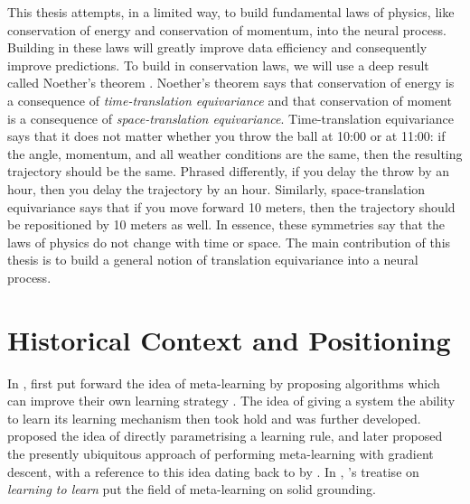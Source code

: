 \documentclass[12pt, twoside]{report}
\newcommand{\xrprefix}[1]{xr-#1}
\begin{document}
This thesis attempts, in a limited way, to build fundamental laws of physics, like conservation of energy and conservation of momentum, into the neural process.
Building in these laws will greatly improve data efficiency and consequently improve predictions.
To build in conservation laws, we will use a deep result called Noether's theorem \parencite{Noether:1918:Invariante_Variationsprobleme}.
Noether's theorem says that conservation of energy is a consequence of \emph{time-translation equivariance} and that conservation of moment is a consequence of \emph{space-translation equivariance}.
Time-translation equivariance says that it does not matter whether you throw the ball at 10:00 or at 11:00: if the angle, momentum, and all weather conditions are the same, then the resulting trajectory should be the same.
Phrased differently, if you delay the throw by an hour, then you delay the trajectory by an hour.
Similarly, space-translation equivariance says that if you move forward 10 meters, then the trajectory should be repositioned by 10 meters as well.
In essence, these symmetries say that the laws of physics do not change with time or space.
The main contribution of this thesis is to build a general notion of translation equivariance into a neural process.


\section{Historical Context and Positioning}
\label{sec:introduction:context}


In \citeyear{Schmidhuber:1987:Evolutionary_Principles_in_Self-Referential_Learning}, \citeauthor{Schmidhuber:1987:Evolutionary_Principles_in_Self-Referential_Learning} first put forward the idea of meta-learning by proposing algorithms which can improve their own learning strategy \parencite{Schmidhuber:1987:Evolutionary_Principles_in_Self-Referential_Learning,Schmidhuber:1992:Learning_to_Control_Fast-Weight_Memories,Schmidhuber:1993:A_Neural_Network_That_Embeds}.
The idea of giving a system the ability to learn its learning mechanism then took hold and was further developed.
\textcite{Bengio:1990:Learning_a_Synaptic_Learning_Rule,Bengio:1995:On_the_Search_for_New_Learning_Rules_in_ANNs} proposed the idea of directly parametrising a learning rule,
and later \textcite{Hochreiter:2001:Learning_to_Learn_Using_Gradient,Younger:2001:Meta-Learning_With_Backpropagation} proposed the presently ubiquitous approach of performing meta-learning with gradient descent, with a reference to this idea dating back to \citeyear{Schmidhuber:1991:A_Possibility_for_Implementing_Curiosity} by \citeauthor{Schmidhuber:1991:A_Possibility_for_Implementing_Curiosity}.
In \citeyear{Thrun:1998:Learning_to_Learn}, \citeauthor{Thrun:1998:Learning_to_Learn}'s treatise on \emph{learning to learn} put the field of meta-learning on solid grounding.
\end{document}
